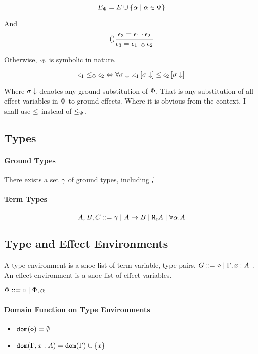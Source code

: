 {\begin{equation}
    E_\P = E \cup \left\{\a \mid \a \in \P \right\}
\end{equation}

And 
\begin{equation}
    \treerule{}{\e_3 = \e_1\dot\e_2}{\e_3 = \e_1\dotp\e_2}
\end{equation}

Otherwise, $\dotp$ is symbolic in nature.

\begin{equation}
    \e_1 \subeffectp \e_2 \Leftrightarrow \forall \si\downarrow. \e_1\sub{\si\downarrow} \subeffect \e_2\sub{\si\downarrow}
\end{equation}

Where $\si\downarrow$ denotes any ground-substitution of $\P$. That is any substitution of all effect-variables in $\P$ to ground effects. Where it is obvious from the context, I shall use $\subeffect$ instead of $\subeffectp$.


\subsection{Types}
    \paragraph{Ground Types}
        There exists a set $\ground$ of ground types, including \U, \B
    \paragraph{Term Types}
    $$ A, B, C \gens \ground \mid \ab \mid \mea \mid \all{\a}{A}$$
  
\subsection{Type and Effect Environments}
A type environment is a snoc-list of term-variable, type pairs, $G \gens \nil \mid \gax$ .
An effect environment is a snoc-list of effect-variables.

$\P\gens\nil\mid\P, \a$
\paragraph{Domain Function on Type Environments}
\begin{itemize}
    \item $\dom{\nil} = \emptyset$
    \item $\dom{\gax} =  \dom{\G}  \cup \left\{x \right\}$
\end{itemize}

}
